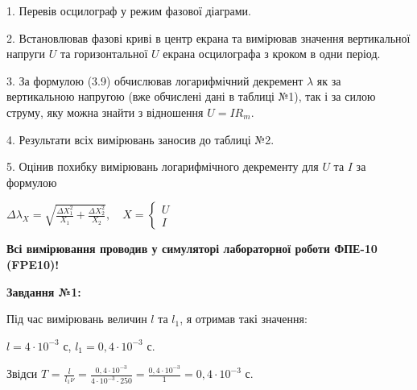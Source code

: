 \documentclass[12pt,a4paper]{article}
\begin{document}
    \setlength{\parindent}{1.5em}

    1. Перевів осцилограф у режим фазової діаграми.
    
    2. Встановлював фазові криві в центр екрана та вимірював значення вертикальної напруги $U$ та горизонтальної $U$ екрана осцилографа з кроком в одни період.

    3. За формулою (3.9) обчислював логарифмічний декремент $\lambda$ як за вертикальною напругою (вже обчислені дані в таблиці №1), так і за силою струму, яку можна знайти з відношення $U = IR_m$.

    4. Результати всіх вимірювань заносив до таблиці №2.

    5. Оцінив похибку вимірювань логарифмічного декременту для $U$ та $I$ за формулою

    \begin{center}
        $\displaystyle \Delta \lambda_X = \sqrt{\frac{\Delta X_1^2}{X_1} + \frac{\Delta X_2^2}{X_2}}, \quad X = 
        \begin{cases}
        U\\
        I
        \end{cases}$
    \end{center}

    \vspace{1em} %
    \setlength{\parindent}{0pt}

    \textbf{Всі вимірювання проводив у симуляторі лабораторної роботи ФПЕ-10 (FPE10)!}

    \newpage

    \textbf{\large Завдання №1:}

    \vspace{1em} %

    Під час вимірювань величин $l$ та $l_1$, я отримав такі значення:

    \vspace{1em} %

    $l = 4 \cdot 10^{-3}$ с, $l_1 = 0,4 \cdot 10^{-3}$ с.

    \vspace{1em} %

    Звідси $T$ = $\displaystyle \frac{l}{l_1 \nu} = \frac{0,4 \cdot 10^{-3}}{4 \cdot 10^{-3} \cdot 250} = \frac{0,4 \cdot 10^{-3}}{1} = 0,4 \cdot 10^{-3}$ с.

    \vspace{1em} %
    \setlength{\parindent}{1.5em}
\end{document}

